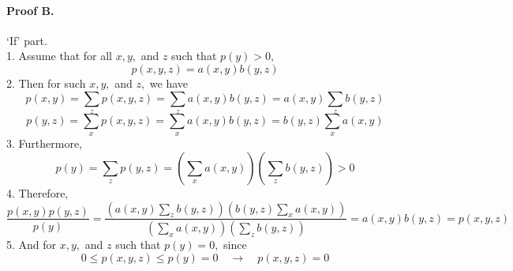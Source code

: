 \documentclass[8pt]{article}
\begin{document}
\paragraph{Proof B.} `If' part.\\
1. Assume that for all $x, y,$ and $z$ such that $p(y)>0$,
$$
p(x, y, z)=a(x, y) b(y, z)
$$
2. Then for such $x, y,$ and $z,$ we have
$$
p(x, y) =\sum_{z} p(x, y, z) =\sum_{z} a(x, y) b(y, z) =a(x, y) \sum_{z} b(y, z)
$$
$$
p(y, z) =\sum_{x} p(x, y, z) =\sum_{x} a(x, y) b(y, z) =b(y, z) \sum_{x} a(x, y)
$$
3. Furthermore,
$$
p(y)=\sum_{z} p(y, z)=\left(\sum_{x} a(x, y)\right)\left(\sum_{z} b(y, z)\right)>0
$$
4. Therefore,
$$
\frac{p(x, y) p(y, z)}{p(y)} =
\frac{\left(a(x, y) \sum_{z} b(y, z)\right) \left(b(y, z) \sum_{x} a(x, y)\right)}{
\left(\sum_{x} a(x, y)\right)\left(\sum_{z} b(y, z)\right)}
= a(x, y) b(y, z) =  p(x, y, z)
$$
5. And for $x, y,$ and $z$ such that $p(y)=0,$ since
$$
0 \leq p(x, y, z) \leq p(y)=0 \quad
\rightarrow \quad
p(x, y, z)=0
$$
\end{document}

